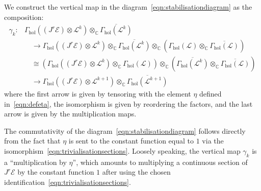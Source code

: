 \documentclass[a4paper]{amsart}
\newcommand{\bC}{\mathbb C}
\newcommand{\cE}{\mathcal E}
\newcommand{\cL}{\mathcal L}
\newcommand{\lra}{\longrightarrow}
\theoremstyle{plain}
\theoremstyle{definition}
\newcommand{\Gammahol}{\Gamma_{\mathrm{hol}}}
\begin{document}
We construct the vertical map in the diagram~\eqref{eqn:stabilisationdiagram} as the composition:
\begin{equation}\label{eqn:stabilisationmap}
\begin{split}
    \gamma_k \colon &\Gammahol\left( (J^r\cE) \otimes \cL^k \right) \otimes_\bC \overline{\Gammahol\left(\cL^k \right)} \\
    &\quad \lra \Gammahol\left( (J^r\cE) \otimes \cL^k \right) \otimes_\bC \overline{\Gammahol\left(\cL^k \right)} \otimes_\bC \left( \Gammahol\left( \cL \right) \otimes_\bC \overline{\Gammahol\left( \cL \right)} \right) \\
    &\quad \cong \left( \Gammahol\left( (J^r\cE) \otimes \cL^k \right) \otimes_\bC \Gammahol\left( \cL \right) \right) \otimes_\bC \left( \overline{\Gammahol\left(\cL^k \right)} \otimes_\bC \overline{\Gammahol\left( \cL \right)} \right) \\
    &\quad \lra \Gammahol\left( (J^r\cE) \otimes \cL^{k+1} \right) \otimes_\bC \overline{\Gammahol\left(\cL^{k+1} \right)}
\end{split}
\end{equation}
where the first arrow is given by tensoring with the element $\eta$ defined in~\eqref{eqn:defeta}, the isomorphism is given by reordering the factors, and the last arrow is given by the multiplication maps.

The commutativity of the diagram~\eqref{eqn:stabilisationdiagram} follows directly from the fact that $\eta$ is sent to the constant function equal to $1$ via the isomorphism~\eqref{eqn:trivialisationsections}. Loosely speaking, the vertical map $\gamma_k$ is a ``multiplication by $\eta$'', which amounts to multiplying a continuous section of $J^r\cE$ by the constant function $1$ after using the chosen identification~\eqref{eqn:trivialisationsections}.
\end{document}
